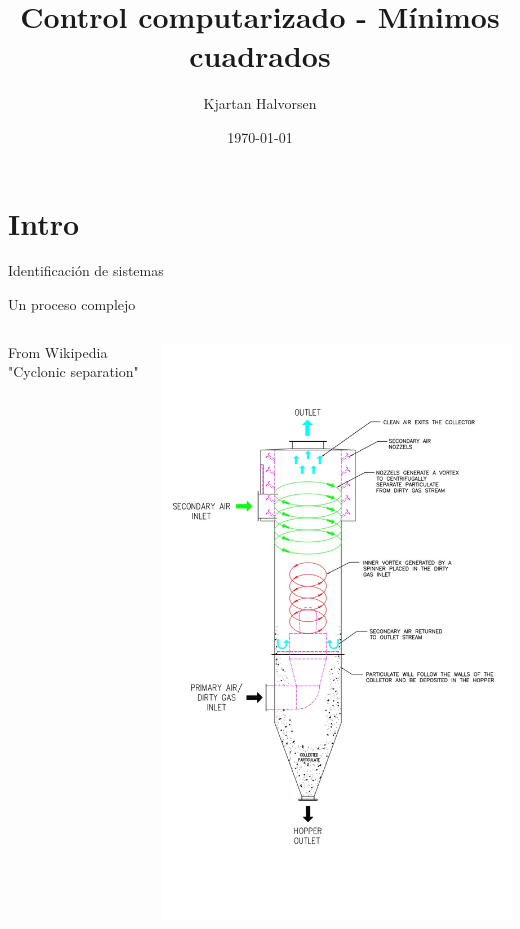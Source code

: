 \documentclass[presentation,aspectratio=169]{beamer}
\author{Kjartan Halvorsen}
\date{\today}
\title{Control computarizado - Mínimos cuadrados}
\begin{document}
\maketitle

\section{Intro}
\label{sec:org3039ec7}
\begin{frame}[label={sec:orgc3f2bb1}]{Identificación de sistemas}
\end{frame}

\begin{frame}[label={sec:org90d5fe9}]{Un proceso complejo}
\begin{columns}
\begin{column}{0.6\columnwidth}
From Wikipedia "Cyclonic separation"
\end{column}
\begin{column}{0.4\columnwidth}
\begin{center}
\includegraphics[height=1.0\textheight]{../../figures/Vertical-cyclone.jpg}
\end{center}
\end{column}
\end{columns}
\end{frame}
\end{document}
